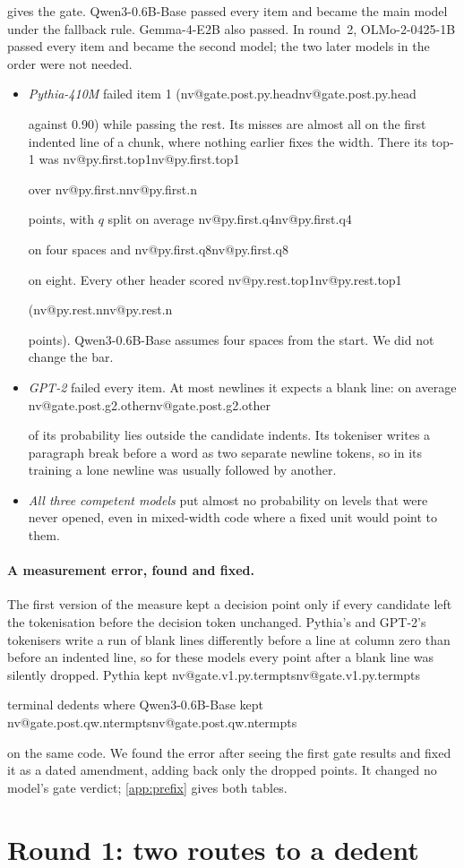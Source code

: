 \documentclass[11pt]{article}
\makeatletter
\newcommand{\nv}[1]{\ifcsname nv@#1\endcsname\csname nv@#1\endcsname\else\PackageError{numbers}{Unknown number key #1}{}\fi}
\newcommand{\qw}{Qwen3-0.6B-Base}
\newcommand{\ol}{OLMo-2-0425-1B}
\makeatother
\begin{document}
 gives the gate. \qw{} passed every item and became the main model under the fallback rule. Gemma-4-E2B also passed. In round~2, \ol{} passed every item and became the second model; the two later models in the order were not needed.
\begin{itemize}
\item \emph{Pythia-410M} failed item 1 (\nv{gate.post.py.head} against 0.90) while passing the rest. Its misses are almost all on the first indented line of a chunk, where nothing earlier fixes the width. There its top-1 was \nv{py.first.top1} over \nv{py.first.n} points, with $q$ split on average \nv{py.first.q4} on four spaces and \nv{py.first.q8} on eight. Every other header scored \nv{py.rest.top1} (\nv{py.rest.n} points). \qw{} assumes four spaces from the start. We did not change the bar.
\item \emph{GPT-2} failed every item. At most newlines it expects a blank line: on average \nv{gate.post.g2.other} of its probability lies outside the candidate indents. Its tokeniser writes a paragraph break before a word as two separate newline tokens, so in its training a lone newline was usually followed by another.
\item \emph{All three competent models} put almost no probability on levels that were never opened, even in mixed-width code where a fixed unit would point to them.
\end{itemize}

\paragraph{A measurement error, found and fixed.} The first version of the measure kept a decision point only if every candidate left the tokenisation before the decision token unchanged. Pythia's and GPT-2's tokenisers write a run of blank lines differently before a line at column zero than before an indented line, so for these models every point after a blank line was silently dropped. Pythia kept \nv{gate.v1.py.termpts} terminal dedents where \qw{} kept \nv{gate.post.qw.ntermpts} on the same code. We found the error after seeing the first gate results and fixed it as a dated amendment, adding back only the dropped points. It changed no model's gate verdict; \cref{app:prefix} gives both tables.

\section{Round 1: two routes to a dedent}
\label{sec:explore}
\end{document}
